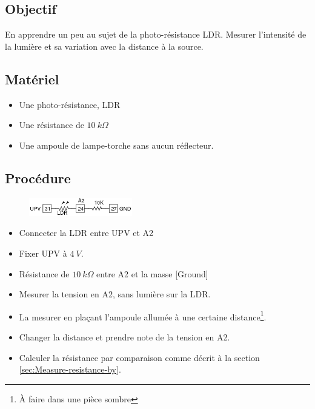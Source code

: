 \documentclass{book}
\begin{document}
\subsection{Objectif}


En apprendre un peu au sujet de la photo-résistance LDR. Mesurer l'intensité de la lumière et sa variation avec la distance à la source.




\subsection{Matériel}


\begin{itemize}
  \item Une photo-résistance, LDR
  \item Une résistance de $10\ k\Omega$
  \item Une ampoule de lampe-torche sans aucun réflecteur.
\end{itemize}

\subsection{Procédure}


\begin{figure}[h!]
\begin{center}
\caption{\label{} }\vspace{0.5em}
\includegraphics[width=0.4\textwidth, height=0.3\textwidth, keepaspectratio]{Schematic-ldr.png}
\end{center}
\end{figure}



\begin{itemize}
  \item Connecter la LDR entre UPV et A2
  \item Fixer UPV à $4\ V$.
  \item Résistance de $10\ k\Omega$  entre A2 et la masse [Ground]
  \item Mesurer la tension en A2, sans lumière sur la LDR.
  \item La mesurer en plaçant l'ampoule allumée à une certaine distance\footnote{À faire dans une pièce sombre}.
  \item Changer la distance et prendre note de la tension en A2.
  \item Calculer la résistance par comparaison comme décrit à la section  \ref{sec:Measure-resistance-by}.
\end{itemize}
\end{document}
